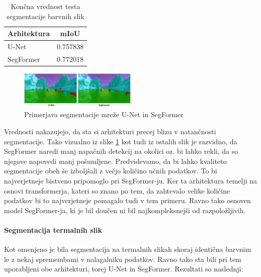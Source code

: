 \documentclass[10pt,twocolumn,letterpaper]{article}
\begin{document}
\begin{table}[h!]
    \begin{center}
        \begin{tabular}{|l|c|}
            \hline
                Arhitektura & mIoU \\
            \hline\hline
                U-Net & 0.757838 \\
                SegFormer & 0.772018 \\
            \hline
        \end{tabular}
    \end{center}
    \caption{Končna vrednost testa segmentacije barvnih slik}
    \label{tab:rezultati_segmentacije_RGB}
\end{table}

\begin{figure}[h!]
    \centering %
    \includegraphics[width=0.5\textwidth]{Slike/unet_vs_segformer.PNG} %
    \caption{Primerjava segmentacije mreže U-Net in SegFormer} %
    \label{fig:rezultati_segmentacije_RGB} %
\end{figure}

Vrednosti nakazujejo, da sta si arhitekturi precej blizu v natančnosti segmentacije. Tako vizualno iz slike \ref{fig:rezultati_segmentacije_RGB} kot tudi iz ostalih slik je razvidno, da SegFormer naredi manj napačnih detekcij na okolici oz. bi lahko rekli, da so njegove napovedi manj pošumljene. Predvidevamo, da bi lahko kvaliteto segmentacije obeh še izboljšali z večjo količino učnih podatkov. To bi najverjetneje bistveno pripomoglo pri SegFormer-ju. Ker ta arhitektura temelji na osnovi transformerja, kateri so znano po tem, da zahtevalo velike količine podatkov bi to najverjetneje pomagalo tudi v tem primeru. Ravno tako osnoven model SegFormer-ja, ki je bil doučen ni bil najkompleksnejši od razpoložljivih.

\paragraph{Segmentacija termalnih slik\newline}
Kot omenjeno je bila segmentacija na termalnih slikah skoraj identična barvnim le z nekaj spremembami v nalagalniku podatkov. Ravno tako sta bili pri tem uporabljeni obe arhitekturi, torej U-Net in SegFormer. Rezultati so naslednji:
\end{document}
